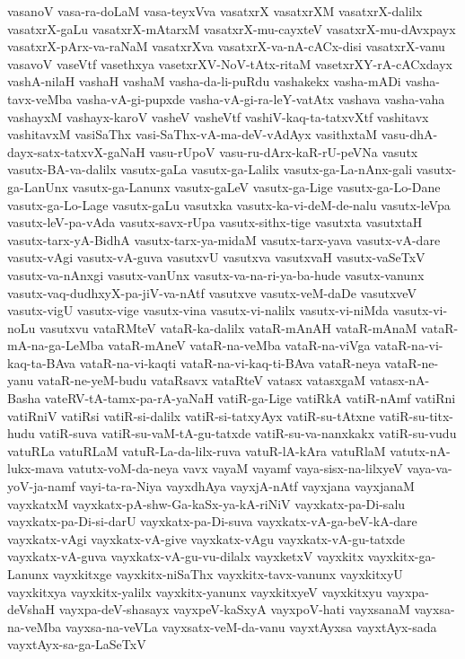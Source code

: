 {vasanoV
vasa-ra-doLaM
vasa-teyxVva
vasatxrX
vasatxrXM
vasatxrX-dalilx
vasatxrX-gaLu
vasatxrX-mAtarxM
vasatxrX-mu-cayxteV
vasatxrX-mu-dAvxpayx
vasatxrX-pArx-va-raNaM
vasatxrXva
vasatxrX-va-nA-cACx-disi
vasatxrX-vanu
vasavoV
vaseVtf
vasethxya
vasetxrXV-NoV-tAtx-ritaM
vasetxrXY-rA-cACxdayx
vashA-nilaH
vashaH
vashaM
vasha-da-li-puRdu
vashakekx
vasha-mADi
vasha-tavx-veMba
vasha-vA-gi-pupxde
vasha-vA-gi-ra-leY-vatAtx
vashava
vasha-vaha
vashayxM
vashayx-karoV
vasheV
vasheVtf
vashiV-kaq-ta-tatxvXtf
vashitavx
vashitavxM
vasiSaThx
vasi-SaThx-vA-ma-deV-vAdAyx
vasithxtaM
vasu-dhA-dayx-satx-tatxvX-gaNaH
vasu-rUpoV
vasu-ru-dArx-kaR-rU-peVNa
vasutx
vasutx-BA-va-dalilx
vasutx-gaLa
vasutx-ga-Lalilx
vasutx-ga-La-nAnx-gali
vasutx-ga-LanUnx
vasutx-ga-Lanunx
vasutx-gaLeV
vasutx-ga-Lige
vasutx-ga-Lo-Dane
vasutx-ga-Lo-Lage
vasutx-gaLu
vasutxka
vasutx-ka-vi-deM-de-nalu
vasutx-leVpa
vasutx-leV-pa-vAda
vasutx-savx-rUpa
vasutx-sithx-tige
vasutxta
vasutxtaH
vasutx-tarx-yA-BidhA
vasutx-tarx-ya-midaM
vasutx-tarx-yava
vasutx-vA-dare
vasutx-vAgi
vasutx-vA-guva
vasutxvU
vasutxva
vasutxvaH
vasutx-vaSeTxV
vasutx-va-nAnxgi
vasutx-vanUnx
vasutx-va-na-ri-ya-ba-hude
vasutx-vanunx
vasutx-vaq-dudhxyX-pa-jiV-va-nAtf
vasutxve
vasutx-veM-daDe
vasutxveV
vasutx-vigU
vasutx-vige
vasutx-vina
vasutx-vi-nalilx
vasutx-vi-niMda
vasutx-vi-noLu
vasutxvu
vataRMteV
vataR-ka-dalilx
vataR-mAnAH
vataR-mAnaM
vataR-mA-na-ga-LeMba
vataR-mAneV
vataR-na-veMba
vataR-na-viVga
vataR-na-vi-kaq-ta-BAva
vataR-na-vi-kaqti
vataR-na-vi-kaq-ti-BAva
vataR-neya
vataR-ne-yanu
vataR-ne-yeM-budu
vataRsavx
vataRteV
vatasx
vatasxgaM
vatasx-nA-Basha
vateRV-tA-tamx-pa-rA-yaNaH
vatiR-ga-Lige
vatiRkA
vatiR-nAmf
vatiRni
vatiRniV
vatiRsi
vatiR-si-dalilx
vatiR-si-tatxyAyx
vatiR-su-tAtxne
vatiR-su-titx-hudu
vatiR-suva
vatiR-su-vaM-tA-gu-tatxde
vatiR-su-va-nanxkakx
vatiR-su-vudu
vatuRLa
vatuRLaM
vatuR-La-da-lilx-ruva
vatuR-lA-kAra
vatuRlaM
vatutx-nA-lukx-mava
vatutx-voM-da-neya
vavx
vayaM
vayamf
vaya-sisx-na-lilxyeV
vaya-va-yoV-ja-namf
vayi-ta-ra-Niya
vayxdhAya
vayxjA-nAtf
vayxjana
vayxjanaM
vayxkatxM
vayxkatx-pA-shw-Ga-kaSx-ya-kA-riNiV
vayxkatx-pa-Di-salu
vayxkatx-pa-Di-si-darU
vayxkatx-pa-Di-suva
vayxkatx-vA-ga-beV-kA-dare
vayxkatx-vAgi
vayxkatx-vA-give
vayxkatx-vAgu
vayxkatx-vA-gu-tatxde
vayxkatx-vA-guva
vayxkatx-vA-gu-vu-dilalx
vayxketxV
vayxkitx
vayxkitx-ga-Lanunx
vayxkitxge
vayxkitx-niSaThx
vayxkitx-tavx-vanunx
vayxkitxyU
vayxkitxya
vayxkitx-yalilx
vayxkitx-yanunx
vayxkitxyeV
vayxkitxyu
vayxpa-deVshaH
vayxpa-deV-shasayx
vayxpeV-kaSxyA
vayxpoV-hati
vayxsanaM
vayxsa-na-veMba
vayxsa-na-veVLa
vayxsatx-veM-da-vanu
vayxtAyxsa
vayxtAyx-sada
vayxtAyx-sa-ga-LaSeTxV
}
